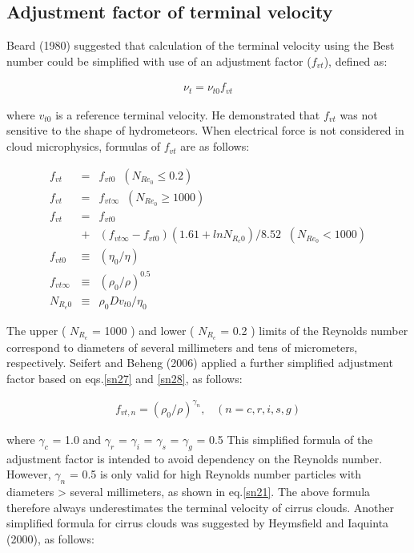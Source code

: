 \subsection{Adjustment factor of terminal velocity}
Beard (1980) suggested that calculation of the terminal velocity using the Best number could be simplified with use of an adjustment factor ($f_{vt}$), defined as:

\begin{eqnarray}
\nu_{t}=\nu_{t0}f_{vt}
\label{sn23}
\end{eqnarray}

where $v_{t0}$ is a reference terminal velocity. He demonstrated that $f_{vt}$ was not sensitive to the shape of hydrometeors. When electrical force is not considered in cloud microphysics, formulas of $f_{vt}$ are as follows:

\begin{eqnarray}
f_{vt}&=&f_{vt0}\;\;(N_{Re_{0}}\leq0.2)\label{sn24}\\
f_{vt}&=&f_{vt\infty}\;\;(N_{Re_{0}}\geq1000)\label{sn25}\\
f_{vt}&=&f_{vt0}\nonumber\\
&+&(f_{vt\infty}-f_{vt0})(1.61+lnN_{R_{e}0})/8.52\;\;(N_{Re_{0}}<1000)\label{sn26}\\
f_{vt0}&\equiv&(\eta_{0}/\eta)\label{sn27}\\
f_{vt\infty}&\equiv&(\rho_{0}/\rho)^{0.5}\label{sn28}\\
N_{R_{e}0}&\equiv&\rho_{0}Dv_{t0}/\eta_{0}\label{sn29}
\end{eqnarray}

The upper ( $N_{R_{e}}$ = 1000 ) and lower ( $N_{R_{e}}$ = 0.2 ) limits of the Reynolds number correspond to diameters of several millimeters and tens of micrometers, respectively. Seifert and Beheng (2006) applied a further simplified adjustment factor based on eqs.\ref{sn27} and \ref{sn28}, as follows:

\begin{eqnarray}
f_{vt,n}=(\rho_{0}/\rho)^{\gamma_{n}}, \;\;\;(n=c,r,i,s,g)
\label{sn30}
\end{eqnarray}

where $\gamma_{c}$ = 1.0 and $\gamma_{r}$ = $\gamma_{i}$ = $\gamma_{s}$ = $\gamma_{g}$ = 0.5 This simplified formula of the adjustment factor is intended to avoid dependency on the Reynolds number. However, $\gamma_{n}$ = 0.5 is only valid for high Reynolds number particles with diameters > several millimeters, as shown in eq.\ref{sn21}. The above formula therefore always underestimates the terminal velocity of cirrus clouds. Another simplified formula for cirrus clouds was suggested by Heymsfield and Iaquinta (2000), as follows:

